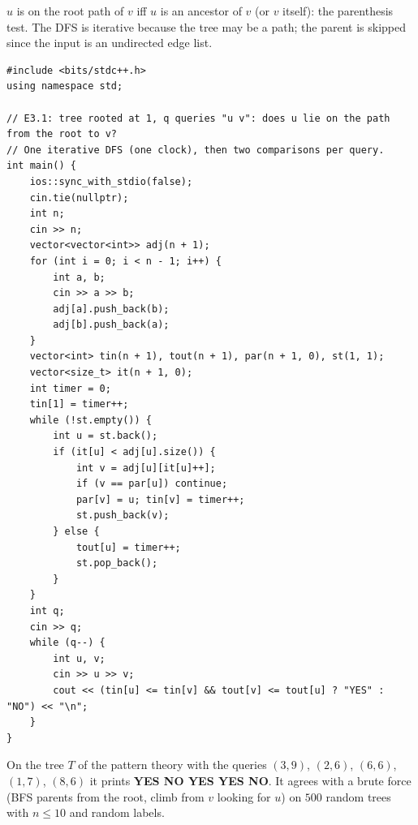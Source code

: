 \begin{solutionbox}
$u$ is on the root path of $v$ iff $u$ is an ancestor of $v$ (or $v$ itself): the parenthesis test. The DFS is iterative because the tree may be a path; the parent is skipped since the input is an undirected edge list.
\begin{lstlisting}[style=cpp]
#include <bits/stdc++.h>
using namespace std;

// E3.1: tree rooted at 1, q queries "u v": does u lie on the path from the root to v?
// One iterative DFS (one clock), then two comparisons per query.
int main() {
    ios::sync_with_stdio(false);
    cin.tie(nullptr);
    int n;
    cin >> n;
    vector<vector<int>> adj(n + 1);
    for (int i = 0; i < n - 1; i++) {
        int a, b;
        cin >> a >> b;
        adj[a].push_back(b);
        adj[b].push_back(a);
    }
    vector<int> tin(n + 1), tout(n + 1), par(n + 1, 0), st(1, 1);
    vector<size_t> it(n + 1, 0);
    int timer = 0;
    tin[1] = timer++;
    while (!st.empty()) {
        int u = st.back();
        if (it[u] < adj[u].size()) {
            int v = adj[u][it[u]++];
            if (v == par[u]) continue;
            par[v] = u; tin[v] = timer++;
            st.push_back(v);
        } else {
            tout[u] = timer++;
            st.pop_back();
        }
    }
    int q;
    cin >> q;
    while (q--) {
        int u, v;
        cin >> u >> v;
        cout << (tin[u] <= tin[v] && tout[v] <= tout[u] ? "YES" : "NO") << "\n";
    }
}
\end{lstlisting}
On the tree $T$ of the pattern theory with the queries $(3,9)$, $(2,6)$, $(6,6)$, $(1,7)$, $(8,6)$ it prints \textbf{YES NO YES YES NO}. It agrees with a brute force (BFS parents from the root, climb from $v$ looking for $u$) on $500$ random trees with $n \le 10$ and random labels.
\end{solutionbox}

